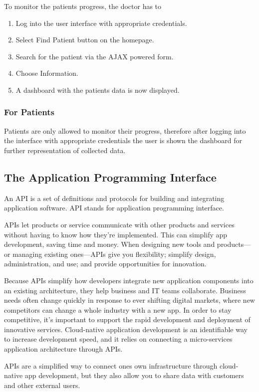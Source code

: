 \documentclass[12pt]{article}
\begin{document}
To monitor the patients progress, the doctor has to
\begin{enumerate}
\item Log into the user interface with appropriate credentials.
\item Select Find Patient button on the homepage.
\item Search for the patient via the AJAX powered form.
\item Choose Information.
\item A dashboard with the patients data is now displayed.
\end{enumerate} 

\subsubsection{For Patients}
Patients are only allowed to monitor their progress, therefore after logging into the interface with appropriate credentials the user is shown the dashboard for further representation of collected data.

\subsection{The Application Programming Interface}
An API is a set of definitions and protocols for building and integrating application software. API stands for application programming interface.

APIs let products or service communicate with other products and services without having to know how they’re implemented. This can simplify app development, saving time and money. When designing new tools and products—or managing existing ones—APIs give you flexibility; simplify design, administration, and use; and provide opportunities for innovation.

Because APIs simplify how developers integrate new application components into an existing architecture, they help business and IT teams collaborate. Business needs often change quickly in response to ever shifting digital markets, where new competitors can change a whole industry with a new app. In order to stay competitive, it's important to support the rapid development and deployment of innovative services. Cloud-native application development is an identifiable way to increase development speed, and it relies on connecting a micro-services application architecture through APIs.

APIs are a simplified way to connect ones own infrastructure through cloud-native app development, but they also allow you to share data with customers and other external users. 
\end{document}
